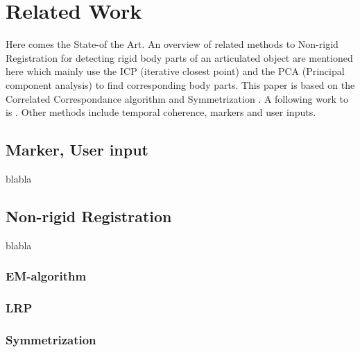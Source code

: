 \chapter{Related Work}
\label{cha:relatedWork}

Here comes the State-of the Art.
An overview of related methods to Non-rigid Registration for detecting rigid body parts of an articulated object are mentioned here \cite{chang08articulated} which mainly use the ICP (iterative closest point) and the PCA (Principal component analysis) to find corresponding body parts. This paper is based on the Correlated Correspondance algorithm \cite{CorrelatedCorrespondance} \cite{Anguelov04} and Symmetrization \cite{Mitra07}. A following work to \cite{chang08articulated} is \cite{chang09range}. Other methods include temporal coherence, markers and user inputs.

\section{Marker, User input}

blabla

\section{Non-rigid Registration}

blabla

\subsection{EM-algorithm}

\subsection{LRP}

\subsection{Symmetrization}

